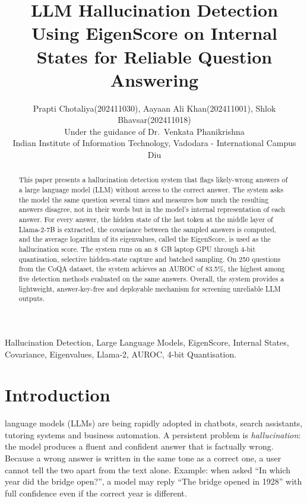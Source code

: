 \documentclass[journal]{IEEEtran}
\begin{document}
\title{LLM Hallucination Detection Using EigenScore on Internal States for Reliable Question Answering}

\author{Prapti Chotaliya(202411030), Aayaan Ali Khan(202411001), Shlok Bhavsar(202411018)\\
Under the guidance of Dr.~Venkata Phanikrishna\\
Indian Institute of Information Technology, Vadodara - International Campus Diu}

\maketitle

\begin{abstract}
This paper presents a hallucination detection system that flags likely-wrong answers of a large language model (LLM) without access to the correct answer. The system asks the model the same question several times and measures how much the resulting answers disagree, not in their words but in the model's internal representation of each answer. For every answer, the hidden state of the last token at the middle layer of Llama-2-7B is extracted, the covariance between the sampled answers is computed, and the average logarithm of its eigenvalues, called the EigenScore, is used as the hallucination score. The system runs on an 8~GB laptop GPU through 4-bit quantisation, selective hidden-state capture and batched sampling. On 250 questions from the CoQA dataset, the system achieves an AUROC of 83.5\%, the highest among five detection methods evaluated on the same answers. Overall, the system provides a lightweight, answer-key-free and deployable mechanism for screening unreliable LLM outputs.
\end{abstract}

\begin{IEEEkeywords}
Hallucination Detection, Large Language Models, EigenScore, Internal States, Covariance, Eigenvalues, Llama-2, AUROC, 4-bit Quantisation.
\end{IEEEkeywords}

\section{Introduction}
 language models (LLMs) are being rapidly adopted in chatbots, search assistants, tutoring systems and business automation. A persistent problem is \emph{hallucination}: the model produces a fluent and confident answer that is factually wrong. Because a wrong answer is written in the same tone as a correct one, a user cannot tell the two apart from the text alone. Example: when asked ``In which year did the bridge open?'', a model may reply ``The bridge opened in 1928'' with full confidence even if the correct year is different.
\end{document}

